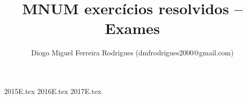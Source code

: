 \documentclass{mnumstyle}
\title{MNUM exercícios resolvidos -- Exames}
\author{Diogo Miguel Ferreira Rodrigues (dmfrodrigues2000@gmail.com)}
\date{}
\begin{document}
\begingroup
\maketitle
	\let\clearpage\relax
	\tableofcontents
\endgroup
{2015E.tex}
{2016E.tex}
{2017E.tex}
\end{document}
